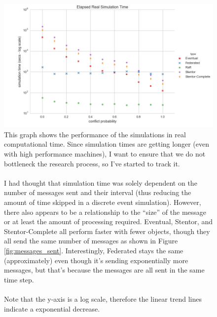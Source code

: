 \documentclass[11pt,letterpaper]{article}
\begin{document}
\begin{figure}[!h]
    \centering
        \includegraphics[width=\textwidth]{figures/simulation_time.png}
        \caption{\textsf{This graph shows the performance of the simulations in real computational time. Since simulation times are getting longer (even with high performance machines), I want to ensure that we do not bottleneck the research process, so I've started to track it.\\
\\
        I had thought that simulation time was solely dependent on the number of messages sent and their interval (thus reducing the amount of time skipped in a discrete event simulation). However, there also appears to be a relationship to the ``size'' of the message or at least the amount of processing required. Eventual, Stentor, and Stentor-Complete all perform faster with fewer objects, though they all send the same number of messages as shown in Figure \ref{fig:messages_sent}. Interestingly, Federated stays the same (approximately) even though it's sending exponentially more messages, but that's because the messages are all sent in the same time step.\\
\\
        Note that the y-axis is a log scale, therefore the linear trend lines indicate a exponential decrease.}}
        \label{fig:simulation_time}
\end{figure}
\end{document}
